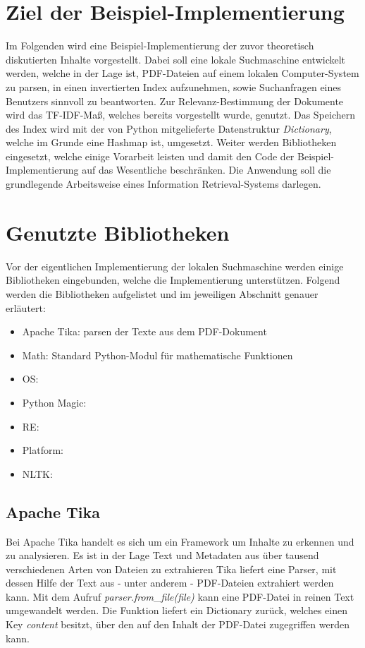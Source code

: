 \section{Ziel der Beispiel-Implementierung}\label{ziel-der-beispiel-implementierung}

Im Folgenden wird eine Beispiel-Implementierung der zuvor theoretisch diskutierten Inhalte vorgestellt. Dabei soll eine lokale Suchmaschine entwickelt werden, welche in der Lage ist, PDF-Dateien auf einem lokalen Computer-System zu parsen, in einen invertierten Index aufzunehmen, sowie Suchanfragen eines Benutzers sinnvoll zu beantworten. Zur Relevanz-Bestimmung der Dokumente wird das TF-IDF-Maß, welches bereits vorgestellt wurde, genutzt. Das Speichern des Index wird mit der von Python mitgelieferte Datenstruktur \textit{Dictionary}, welche im Grunde eine Hashmap ist, umgesetzt. Weiter werden Bibliotheken eingesetzt, welche einige Vorarbeit leisten und damit den Code der Beispiel-Implementierung auf das Wesentliche beschränken. Die Anwendung soll die grundlegende Arbeitsweise eines Information Retrieval-Systems darlegen.

\section{Genutzte Bibliotheken}\label{genutzte-bibliotheken}

Vor der eigentlichen Implementierung der lokalen Suchmaschine werden einige Bibliotheken eingebunden, welche die Implementierung unterstützen. Folgend werden die Bibliotheken aufgelistet und im jeweiligen Abschnitt genauer erläutert:
\begin{itemize}
	\item Apache Tika: parsen der Texte aus dem PDF-Dokument
	\item Math: Standard Python-Modul für mathematische Funktionen
	\item OS: 
	\item Python Magic:
	\item RE:
	\item Platform:
	\item NLTK:
\end{itemize}

\subsection{Apache Tika}\label{apache-tika}

Bei Apache Tika handelt es sich um ein Framework um Inhalte zu erkennen und zu analysieren. Es ist in der Lage Text und Metadaten aus über tausend verschiedenen Arten von Dateien zu extrahieren Tika liefert eine Parser, mit dessen Hilfe der Text aus - unter anderem - PDF-Dateien extrahiert werden kann. Mit dem Aufruf \emph{parser.from}\_\emph{file(file)} kann eine PDF-Datei in reinen Text umgewandelt werden. Die Funktion liefert ein Dictionary zurück, welches einen Key \emph{content} besitzt, über den auf den Inhalt der PDF-Datei zugegriffen werden kann.

